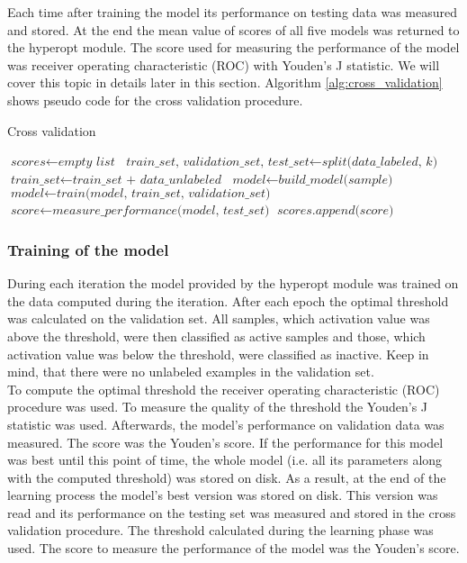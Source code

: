 \documentclass[a4paper,10pt]{report}
\begin{document}
	Each time after training the model its performance on testing data was measured and stored. At the end the mean value of scores of all five models was returned to the hyperopt module. The score used for measuring the performance of the model was receiver operating characteristic (ROC) with Youden's J statistic. We will cover this topic in details later in this section. Algorithm \ref{alg:cross_validation} shows pseudo code for the cross validation procedure.\\
	
	\begin{algorithm}
	\caption{Cross validation}\label{alg:cross_validation}
	\begin{algorithmic}[1]
	\State
	\State $\textit{scores} \gets \textit{empty list}$
	\State
	  \State $\textit{train\_set, validation\_set, test\_set} \gets \textit{split(data\_labeled, k)} $
	  \State $\textit{train\_set} \gets \textit{train\_set + data\_unlabeled}$
	  \State $\textit{model} \gets \textit{build\_model(sample)}$
	  \State $\textit{model} \gets \textit{train(model, train\_set, validation\_set)}$
	  \State $\textit{score} \gets \textit{measure\_performance(model, test\_set)}$
	  \State $\textit{scores.append(score)}$
	\EndFor
	\State       
	\State
	\EndProcedure
	\end{algorithmic}
	\end{algorithm}
	
	\subsubsection{Training of the model}
	During each iteration the model provided by the hyperopt module was trained on the data computed during the iteration. After each epoch the optimal threshold was calculated on the validation set. All samples, which activation value was above the threshold, were then classified as active samples and those, which activation value was below the threshold, were classified as inactive. Keep in mind, that there were no unlabeled examples in the validation set.\\
	
	To compute the optimal threshold the receiver operating characteristic (ROC) procedure was used. To measure the quality of the threshold the Youden's J statistic was used. Afterwards, the model's performance on validation data was measured. The score was the Youden's score. If the performance for this model was best until this point of time, the whole model (i.e. all its parameters along with the computed threshold) was stored on disk. As a result, at the end of the learning process the model's best version was stored on disk. This version was read and its performance on the testing set was measured and stored in the cross validation procedure. The threshold calculated during the learning phase was used. The score to measure the performance of the model was the Youden's score.\\
	
\end{document}
